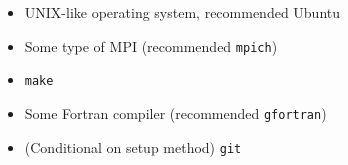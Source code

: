 \begin{itemize}
    \item UNIX-like operating system, recommended Ubuntu
    \item Some type of \ac{MPI} (recommended {\tt mpich})
    \item {\tt make}
    \item Some Fortran compiler (recommended {\tt gfortran})
    \item (Conditional on setup method) {\tt git}
\end{itemize}
